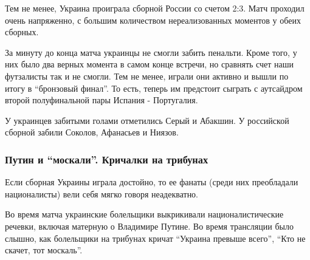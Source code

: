 Тем не менее, Украина проиграла сборной России со счетом 2:3. Матч проходил
очень напряженно, с большим количеством нереализованных моментов у обеих
сборных.

За минуту до конца матча украинцы не смогли забить пенальти. Кроме того, у них
было два верных момента в самом конце встречи, но сравнять счет наши футзалисты
так и не смогли. Тем не менее, играли они активно и вышли по итогу в \enquote{бронзовый
финал}. То есть, теперь им предстоит сыграть с аутсайдром второй полуфинальной
пары Испания - Португалия.

У украинцев забитыми голами отметились Серый и Абакшин. У российской сборной
забили Соколов, Афанасьев и Ниязов.

\subsubsection{Путин и \enquote{москали}. Кричалки на трибунах}

Если сборная Украины играла достойно, то ее фанаты (среди них преобладали
националисты) вели себя мягко говоря неадекватно.

Во время матча украинские болельщики выкрикивали националистические речевки,
включая матерную о Владимире Путине. Во время трансляции было слышно, как
болельщики на трибунах кричат \enquote{Украина превыше всего}, \enquote{Кто не скачет, тот
москаль}.
